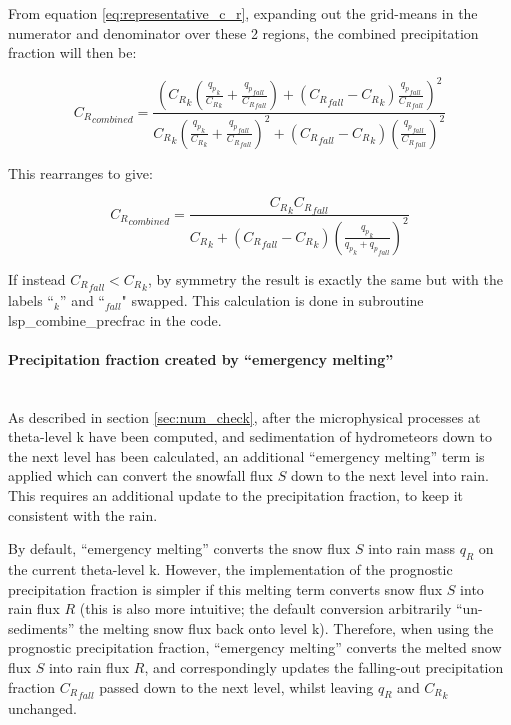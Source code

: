 \documentclass{UMDP_article}
\begin{document}
From equation \ref{eq:representative_c_r}, expanding out the grid-means
in the numerator and denominator over these 2 regions,
the combined precipitation fraction will then be:

\[
{C_R}_{combined} = \frac{ \left( {C_R}_k \left( \frac{{q_p}_k}{{C_R}_k}
                                           + \frac{{q_p}_{fall}}{{C_R}_{fall}}
                                      \right)
                            + \left( {C_R}_{fall} - {C_R}_k \right)
                              \frac{{q_p}_{fall}}{{C_R}_{fall}} \right)^2 }
                     { {C_R}_k \left( \frac{{q_p}_k}{{C_R}_k}
                                   + \frac{{q_p}_{fall}}{{C_R}_{fall}}
                                      \right)^2
                            + \left( {C_R}_{fall} - {C_R}_k \right)
                              \left( \frac{{q_p}_{fall}}{{C_R}_{fall}} \right)^2 }
\]

This rearranges to give:

\begin{equation} \label{eq:combine_cr}
{C_R}_{combined} = \frac{ {C_R}_k {C_R}_{fall} }
                      { {C_R}_k + \left( {C_R}_{fall} - {C_R}_k \right)
                        \left( \frac{{q_p}_k}{{q_p}_k + {q_p}_{fall}} \right)^2 }
\end{equation}

If instead ${C_R}_{fall} < {C_R}_k$, by symmetry the result is exactly the
same but with the labels ``$_k$'' and ``$_{fall}$" swapped.
This calculation is done in subroutine lsp\_combine\_precfrac in the code.

\paragraph{Precipitation fraction created by ``emergency melting''}
\label{sec:precfrac:emerg}
~\\

As described in section \ref{sec:num_check}, after the microphysical
processes at theta-level k have been computed, and sedimentation
of hydrometeors down to the next level has been calculated,
an additional ``emergency melting'' term is applied which can convert
the snowfall flux $S$ down to the next level into rain.
This requires an additional update to the precipitation fraction,
to keep it consistent with the rain.

By default, ``emergency melting'' converts the snow flux $S$
into rain mass $q_R$ on the current theta-level k.  However, the implementation
of the prognostic precipitation fraction is simpler if this melting term
converts snow flux $S$ into rain flux $R$ (this is also more intuitive;
the default conversion arbitrarily ``un-sediments'' the melting snow flux
back onto level k).
Therefore, when using the prognostic precipitation fraction,
``emergency melting'' converts the melted snow flux $S$ into rain flux $R$,
and correspondingly updates the falling-out precipitation fraction
${C_R}_{fall}$ passed down to the next level, whilst leaving $q_R$ and ${C_R}_k$
unchanged.
\end{document}
